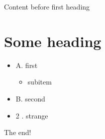 \documentclass[11pt,a4paper]{article}
\begin{document}
Content before first heading

\section{Some heading}

\begin{itemize}
\item A. first
  \begin{itemize}
\item subitem
  \end{itemize}
\item B. second
\item 2 . strange
\end{itemize}

The end!
\end{document}
